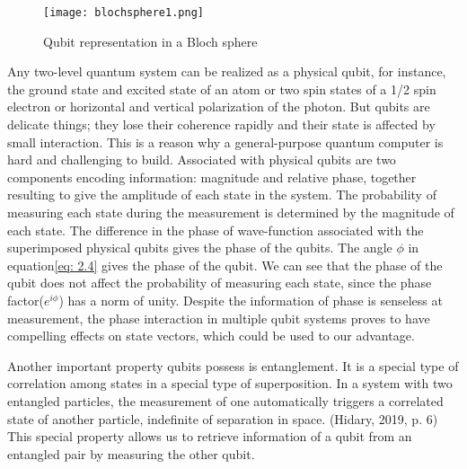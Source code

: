 \begin{figure}
    \centering
    \texttt{[image: blochsphere1.png]}
    \caption{Qubit representation in a Bloch sphere}
\end{figure}
    
    

Any two-level quantum system can be realized as a physical qubit, for instance, the ground state and excited state of an atom or two spin states of a 1/2 spin electron or horizontal and vertical polarization of the photon.\cite{DiVincenzo} But qubits are delicate things; they lose their coherence rapidly and their state is affected by small interaction. This is a reason why a general-purpose quantum computer is hard and challenging to build. Associated with physical qubits are two components encoding information: magnitude and relative phase, together resulting to give the amplitude of each state in the system.\cite{johnston2019} The probability of measuring each state during the measurement is determined by the magnitude of each state. The difference in the phase of wave-function associated with the superimposed physical qubits gives the phase of the qubits. The angle $\phi$ in equation\eqref{eq: 2.4} gives the phase of the qubit. We can see that the phase of the qubit does not affect the probability of measuring each state, since the phase factor($e^{i\phi}$) has a norm of unity. Despite the information of phase is senseless at measurement, the phase interaction in multiple qubit systems proves to have compelling effects on state vectors, which could be used to our advantage.


Another important property qubits possess is entanglement. It is a special type of correlation among states in a special type of superposition. In a system with two entangled particles, the measurement of one automatically triggers a correlated state of another particle, indefinite of separation in space. \cite{Hidary}(Hidary, 2019, p. 6) This special property allows us to retrieve information of a qubit from an entangled pair by measuring the other qubit.
